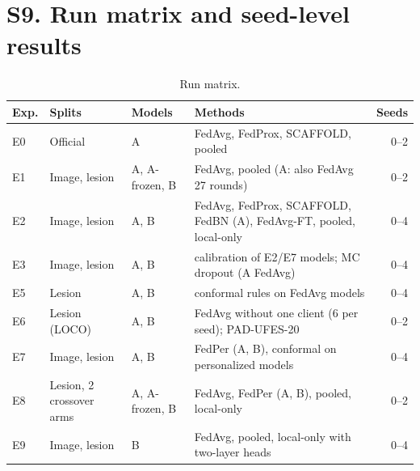 \documentclass[10pt]{article}
\begin{document}
\section*{S9. Run matrix and seed-level results}
\begin{table}[!htbp]
\centering
\footnotesize
\caption{Run matrix.}
\label{tab:s10runs}
\begin{tabular}{@{}llllr@{}}
\toprule
Exp. & Splits & Models & Methods & Seeds \\
\midrule
E0 & Official & A & FedAvg, FedProx, SCAFFOLD, pooled & 0--2 \\
E1 & Image, lesion & A, A-frozen, B & FedAvg, pooled (A: also FedAvg 27 rounds) & 0--2 \\
E2 & Image, lesion & A, B & FedAvg, FedProx, SCAFFOLD, FedBN (A), FedAvg-FT, pooled, local-only & 0--4 \\
E3 & Image, lesion & A, B & calibration of E2/E7 models; MC dropout (A FedAvg) & 0--4 \\
E5 & Lesion & A, B & conformal rules on FedAvg models & 0--4 \\
E6 & Lesion (LOCO) & A, B & FedAvg without one client (6 per seed); PAD-UFES-20 & 0--2 \\
E7 & Image, lesion & A, B & FedPer (A, B), conformal on personalized models & 0--4 \\
E8 & Lesion, 2 crossover arms & A, A-frozen, B & FedAvg, FedPer (A, B), pooled, local-only & 0--2 \\
E9 & Image, lesion & B & FedAvg, pooled, local-only with two-layer heads & 0--4 \\
\bottomrule
\end{tabular}
\end{table}
\end{document}
